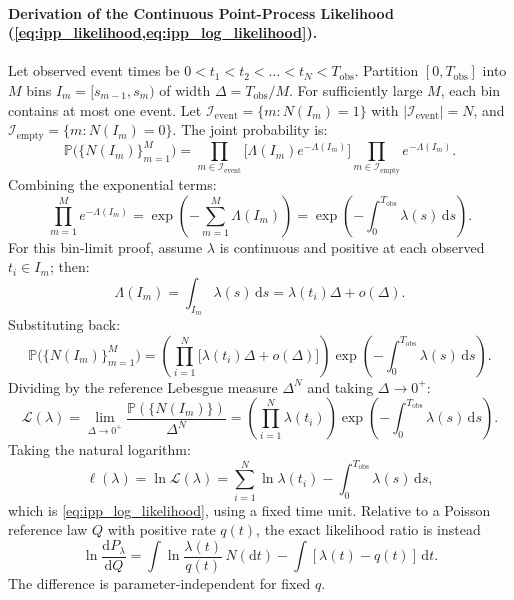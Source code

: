 \paragraph{Derivation of the Continuous Point-Process Likelihood
(\cref{eq:ipp_likelihood,eq:ipp_log_likelihood}).}
Let observed event times be $0 < t_1 < t_2 < \dots < t_N < T_{\mathrm{obs}}$.
Partition $[0, T_{\mathrm{obs}}]$ into $M$ bins $I_m = [s_{m-1},
s_m)$ of width $\Delta = T_{\mathrm{obs}}/M$.
For sufficiently large $M$, each bin contains at most one event.
Let $\mathcal{I}_{\mathrm{event}} = \{m : N(I_m) = 1\}$ with
$|\mathcal{I}_{\mathrm{event}}| = N$,
and $\mathcal{I}_{\mathrm{empty}} = \{m : N(I_m) = 0\}$.
The joint probability is:
\begin{equation}
  \mathbb{P}\bigl(\{N(I_m)\}_{m=1}^M\bigr) = \prod_{m \in
  \mathcal{I}_{\mathrm{event}}} \bigl[\Lambda(I_m)
  e^{-\Lambda(I_m)}\bigr] \prod_{m \in \mathcal{I}_{\mathrm{empty}}}
  e^{-\Lambda(I_m)}.
\end{equation}
Combining the exponential terms:
\begin{equation}
  \prod_{m=1}^M e^{-\Lambda(I_m)} = \exp\left( -\sum_{m=1}^M
  \Lambda(I_m) \right) = \exp\left( -\int_0^{T_{\mathrm{obs}}}
  \lambda(s)\,\mathrm{d}s \right).
\end{equation}
For this bin-limit proof, assume $\lambda$ is continuous and positive at
each observed $t_i\in I_m$; then:
\begin{equation}
  \Lambda(I_m) = \int_{I_m} \lambda(s)\,\mathrm{d}s =
  \lambda(t_i)\Delta + o(\Delta).
\end{equation}
Substituting back:
\begin{equation}
  \mathbb{P}\bigl(\{N(I_m)\}_{m=1}^M\bigr) = \left( \prod_{i=1}^N
  \bigl[\lambda(t_i)\Delta + o(\Delta)\bigr] \right) \exp\left(
  -\int_0^{T_{\mathrm{obs}}} \lambda(s)\,\mathrm{d}s \right).
\end{equation}
Dividing by the reference Lebesgue measure $\Delta^N$ and taking
$\Delta \to 0^+$:
\begin{equation}
  \mathcal{L}(\lambda) = \lim_{\Delta \to 0^+}
  \frac{\mathbb{P}(\{N(I_m)\})}{\Delta^N} = \left( \prod_{i=1}^N
  \lambda(t_i) \right) \exp\left( -\int_0^{T_{\mathrm{obs}}}
  \lambda(s)\,\mathrm{d}s \right).
\end{equation}
Taking the natural logarithm:
\begin{equation}
  \ell(\lambda) = \ln \mathcal{L}(\lambda) = \sum_{i=1}^N \ln
  \lambda(t_i) - \int_0^{T_{\mathrm{obs}}} \lambda(s)\,\mathrm{d}s,
\end{equation}
which is \cref{eq:ipp_log_likelihood}, using a fixed time unit.
Relative to a Poisson reference law $Q$ with positive rate $q(t)$,
the exact likelihood ratio is instead
\begin{equation}
  \ln\frac{\mathrm{d}P_\lambda}{\mathrm{d}Q}
  =\int\ln\frac{\lambda(t)}{q(t)}\,N(\mathrm{d}t)
  -\int[\lambda(t)-q(t)]\,\mathrm{d}t.
\end{equation}
The difference is parameter-independent for fixed $q$.


